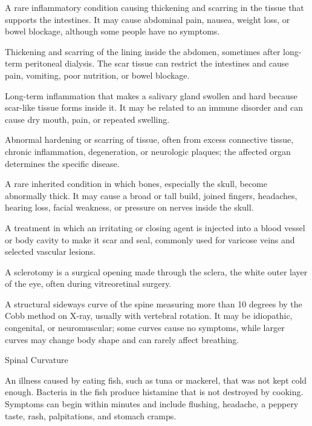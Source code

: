  A rare inflammatory condition causing thickening and scarring in the tissue that supports the intestines. It may cause abdominal pain, nausea, weight loss, or bowel blockage, although some people have no symptoms.

 Thickening and scarring of the lining inside the abdomen, sometimes after long-term peritoneal dialysis. The scar tissue can restrict the intestines and cause pain, vomiting, poor nutrition, or bowel blockage.

 Long-term inflammation that makes a salivary gland swollen and hard because scar-like tissue forms inside it. It may be related to an immune disorder and can cause dry mouth, pain, or repeated swelling.

 Abnormal hardening or scarring of tissue, often from excess connective tissue, chronic inflammation, degeneration, or neurologic plaques; the affected organ determines the specific disease.

 A rare inherited condition in which bones, especially the skull, become abnormally thick. It may cause a broad or tall build, joined fingers, headaches, hearing loss, facial weakness, or pressure on nerves inside the skull.

 A treatment in which an irritating or closing agent is injected into a blood vessel or body cavity to make it scar and seal, commonly used for varicose veins and selected vascular lesions.

 A sclerotomy is a surgical opening made through the sclera, the white outer layer of the eye, often during vitreoretinal surgery.

 A structural sideways curve of the spine measuring more than 10 degrees by the Cobb method on X-ray, usually with vertebral rotation. It may be idiopathic, congenital, or neuromuscular; some curves cause no symptoms, while larger curves may change body shape and can rarely affect breathing.

\synonyms
Spinal Curvature

 An illness caused by eating fish, such as tuna or mackerel, that was not kept cold enough. Bacteria in the fish produce histamine that is not destroyed by cooking. Symptoms can begin within minutes and include flushing, headache, a peppery taste, rash, palpitations, and stomach cramps.

